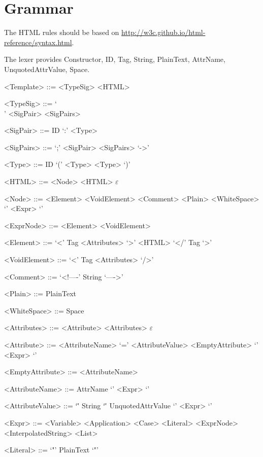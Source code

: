 \documentclass{report}
\begin{document}
\setlength{\grammarparsep}{4pt} %
\setlength{\grammarindent}{12em} %

\section*{Grammar}

The HTML rules should be based on
\url{http://w3c.github.io/html-reference/syntax.html}.

The lexer provides Constructor, ID, Tag, String, PlainText,
AttrName, UnquotedAttrValue, Space.

\begin{grammar}

<Template> ::= <TypeSig> <HTML>

<TypeSig> ::= `\\' <SigPair> <SigPairs>

<SigPair> ::= ID `:' <Type>

<SigPairs> ::= `;' <SigPair> <SigPairs>
\alt `->'

<Type> ::= ID
\alt `(' <Type> <Type> `)'

<HTML> ::= <Node> <HTML>
\alt $\varepsilon$

<Node> ::= <Element>
\alt <VoidElement>
\alt <Comment>
\alt <Plain>
\alt <WhiteSpace>
\alt `{' <Expr> `}'

<ExprNode> ::= <Element>
\alt <VoidElement>

<Element> ::= `<' Tag <Attributes> `>' <HTML> `</' Tag `>'

<VoidElement> ::= `<' Tag <Attributes> `/>'

<Comment> ::= `<!----' String `---->'

<Plain> ::= PlainText

<WhiteSpace> ::= Space

<Attributes> ::= <Attribute> <Attributes>
\alt $\varepsilon$

<Attribute> ::= <AttributeName> `=' <AttributeValue>
\alt <EmptyAttribute>
\alt `{' <Expr> `}'

<EmptyAttribute> ::= <AttributeName>

<AttributeName> ::= AttrName
\alt `{' <Expr> `}'

<AttributeValue> ::= `\"' String `\"'
\alt UnquotedAttrValue
\alt `{' <Expr> `}'

<Expr> ::= <Variable>
\alt <Application>
\alt <Case>
\alt <Literal>
\alt <ExprNode>
\alt <InterpolatedString>
\alt <List>

<Literal> ::= `"' PlainText `"'


\end{grammar}
\end{document}
